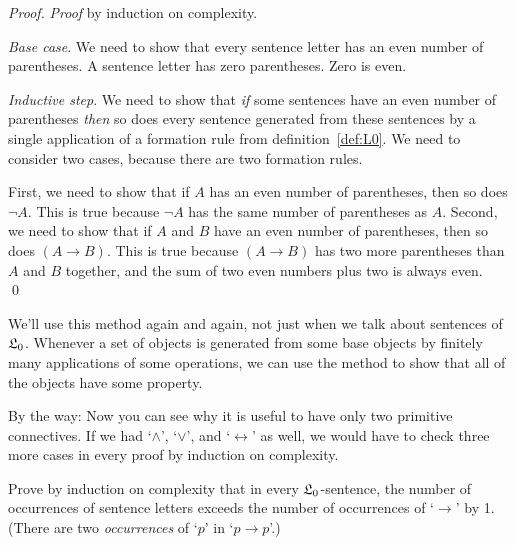 \begin{proof}
  \emph{Proof} by induction on complexity.

\emph{Base case}.
We need to show that
every sentence letter has an even number of parentheses.
A sentence letter has zero parentheses.
Zero is even.

\emph{Inductive step}.
We need to show that \textit{if}
some sentences have an even number of parentheses
\emph{then} so does every sentence generated from these sentences
by a single application of a formation rule from definition~\ref{def:L0}.
We need to consider two cases,
because there are two formation rules.

First,
we need to show that
if $A$ has an even number of parentheses,
then so does $\neg A$.
This is true because $\neg A$ has the same number of parentheses as $A$.
Second,
we need to show that
if $A$ and $B$ have an even number of parentheses,
then so does $(A \to B)$.
This is true because $(A \to B)$ has two more parentheses than $A$ and $B$ together,
and the sum of two even numbers plus two is always even.
\qed
\end{proof}


We'll use this method again and again,
not just when we talk about sentences of $\mathfrak{L}_{0}$.
Whenever a set of objects is generated from some base objects
by finitely many applications of some operations,
we can use the method to show that all of the objects have some property.

By the way:
Now you can see why it is useful to have only two primitive connectives.
If we had `$\land$', `$\lor$', and `$\leftrightarrow$' as well,
we would have to check three more cases in every proof by induction on complexity.


\begin{exercise}
  Prove by induction on complexity that
  in every $\mathfrak{L}_{0}$-sentence,
  the number of occurrences of sentence letters exceeds the number of occurrences of `$\to$' by 1.
  (There are two \emph{occurrences} of `$p$' in `$p \to p$'.)
\end{exercise}


